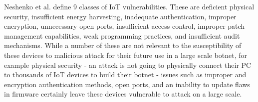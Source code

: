 Neshenko et al.\cite{neshenko_2019} define 9 classes of IoT vulnerabilities. These are
deficient physical security, insufficient energy harvesting, inadequate
authentication, improper encryption, unnecessary open ports, insufficient access
control, improper patch management capabilities, weak programming practices, and
insufficient audit mechanisms. While a number of these are not relevant to the
susceptibility of these devices to malicious attack for their future use in a
large scale botnet, for example physical security - an attack is not going to
physically connect their PC to thousands of IoT devices to build their botnet -
issues such as improper and encryption authentication methods, open ports, and
an inability to update flaws in firmware certainly leave these devices
vulnerable to attack on a large scale.
